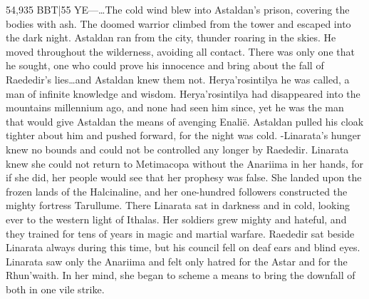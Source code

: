 \documentclass[smalldemyvopaper,11pt,twoside,onecolumn,openright,extrafontsizes]{memoir}
\begin{document}
54,935 BBT|55 YE—…The cold wind blew into Astaldan’s prison, covering the bodies with ash. The doomed warrior climbed from the tower and escaped into the dark night. Astaldan ran from the city, thunder roaring in the skies. He moved throughout the wilderness, avoiding all contact. There was only one that he sought, one who could prove his innocence and bring about the fall of Raededir’s lies…and Astaldan knew them not. Herya’rosintilya he was called, a man of infinite knowledge and wisdom. Herya’rosintilya had disappeared into the mountains millennium ago, and none had seen him since, yet he was the man that would give Astaldan the means of avenging Enalië. Astaldan pulled his cloak tighter about him and pushed forward, for the night was cold.
-Linarata’s hunger knew no bounds and could not be controlled any longer by Raededir. Linarata knew she could not return to Metimacopa without the Anariima in her hands, for if she did, her people would see that her prophesy was false. She landed upon the frozen lands of the Halcinaline, and her one-hundred followers constructed the mighty fortress Tarullume. There Linarata sat in darkness and in cold, looking ever to the western light of Ithalas. Her soldiers grew mighty and hateful, and they trained for tens of years in magic and martial warfare. Raededir sat beside Linarata always during this time, but his council fell on deaf ears and blind eyes. Linarata saw only the Anariima and felt only hatred for the Astar and for the Rhun’waith. In her mind, she began to scheme a means to bring the downfall of both in one vile strike.
\end{document}
